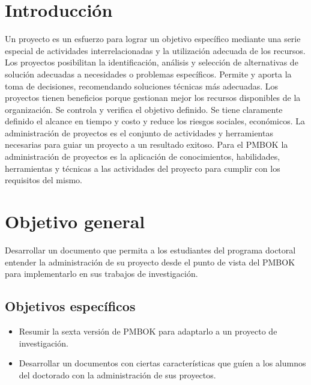\documentclass[letterpaper,12pt,openright,oneside]{article}
\theoremstyle{plain}
\begin{document}
\newpage
\hypersetup{linkcolor=black}
\tableofcontents
\listoffigures

\newpage
\linenumbers
% 
%
\section*{Introducción}

Un proyecto es un esfuerzo para lograr un objetivo específico mediante una serie especial de actividades interrelacionadas y la utilización adecuada de los recursos.
Los proyectos posibilitan la identificación, análisis y selección de alternativas de solución adecuadas a necesidades o problemas específicos.
Permite y aporta la toma de decisiones, recomendando soluciones técnicas más adecuadas.
Los proyectos tienen beneficios porque gestionan mejor los recursos disponibles de la organización.
Se controla y verifica el objetivo definido.
Se tiene claramente definido el alcance en tiempo y costo y reduce los riesgos sociales, económicos.
La administración de proyectos es el conjunto de actividades y herramientas necesarias para guiar un proyecto a un resultado exitoso.
Para el PMBOK la administración de proyectos es la aplicación de conocimientos, habilidades, herramientas y técnicas a las actividades del proyecto para cumplir con los requisitos del mismo.
% 
% 
\section*{Objetivo general}

Desarrollar un documento que permita a los estudiantes del programa doctoral entender la administración de su proyecto desde el punto de vista del PMBOK para implementarlo en sus trabajos de investigación. 
% 
%
\subsection*{Objetivos específicos}

\begin{itemize}
    \item Resumir la sexta versión de PMBOK para adaptarlo a un proyecto de investigación.
    \item Desarrollar un documentos con ciertas características que guíen a los alumnos del doctorado con la administración de sus proyectos.
\end{itemize}
\end{document}
